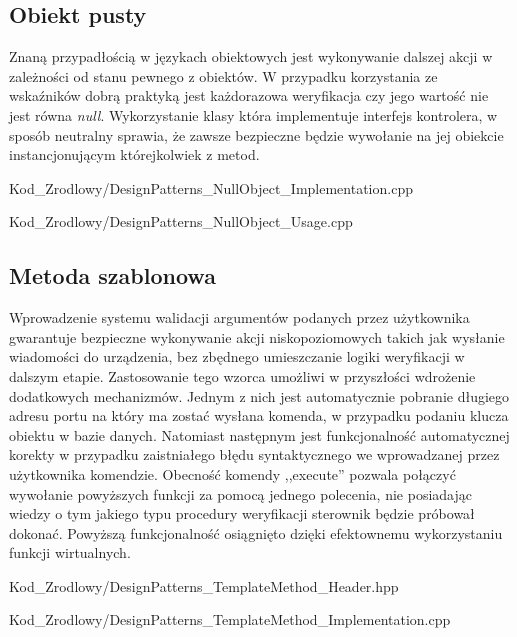     \subsection{Obiekt pusty}
        Znaną przypadłością w językach obiektowych jest wykonywanie dalszej akcji w zależności od stanu pewnego z obiektów.
        W przypadku korzystania ze wskaźników dobrą praktyką jest każdorazowa weryfikacja czy jego wartość nie jest równa \textit{null}.
        Wykorzystanie klasy która implementuje interfejs kontrolera, w sposób neutralny sprawia, że zawsze bezpieczne będzie wywołanie na jej obiekcie 
        instancjonującym którejkolwiek z metod.
    \newpage
        
            {Kod_Zrodlowy/DesignPatterns_NullObject_Implementation.cpp}
        
            {Kod_Zrodlowy/DesignPatterns_NullObject_Usage.cpp}
    \newpage
    \subsection{Metoda szablonowa}
        Wprowadzenie systemu walidacji argumentów podanych przez użytkownika gwarantuje bezpieczne wykonywanie akcji niskopoziomowych takich
        jak wysłanie wiadomości do urządzenia, bez zbędnego umieszczanie logiki weryfikacji w dalszym etapie. Zastosowanie tego wzorca umożliwi w przyszłości wdrożenie dodatkowych mechanizmów.
        Jednym z nich jest automatycznie pobranie długiego adresu portu na który ma zostać wysłana komenda, w przypadku podaniu klucza obiektu w bazie danych. 
        Natomiast następnym jest funkcjonalność automatycznej korekty w przypadku zaistniałego błędu syntaktycznego we wprowadzanej przez użytkownika komendzie.
        Obecność komendy ,,execute'' pozwala połączyć wywołanie powyższych funkcji za pomocą jednego polecenia,
        nie posiadając wiedzy o tym jakiego typu procedury weryfikacji sterownik będzie próbował dokonać. Powyższą funkcjonalność osiągnięto dzięki efektownemu wykorzystaniu
        funkcji wirtualnych.
        
            {Kod_Zrodlowy/DesignPatterns_TemplateMethod_Header.hpp}
        
            {Kod_Zrodlowy/DesignPatterns_TemplateMethod_Implementation.cpp}
